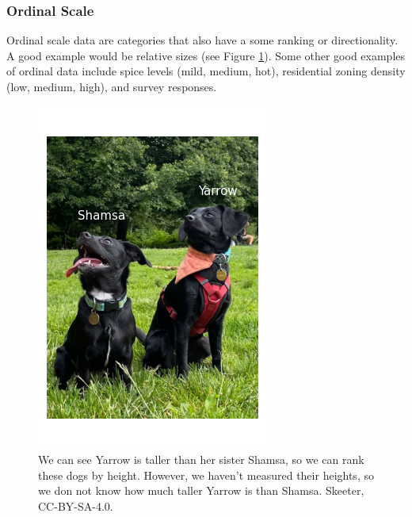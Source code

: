 \documentclass[
]{book}
\begin{document}
\hypertarget{ordinal-scale}{%
\subsubsection{Ordinal Scale}\label{ordinal-scale}}

Ordinal scale data are categories that also have a some ranking or directionality. A good example would be relative sizes (see Figure \ref{fig:3-dogs-ordinal}). Some other good examples of ordinal data include spice levels (mild, medium, hot), residential zoning density (low, medium, high), and survey responses.

\begin{figure}
\includegraphics[width=0.75\linewidth]{images/03-dogs-ordinal} \caption{We can see Yarrow is taller than her sister Shamsa, so we can rank these dogs by height. However, we haven't measured their heights, so we don not know how much taller Yarrow is than Shamsa. Skeeter, CC-BY-SA-4.0.}\label{fig:3-dogs-ordinal}
\end{figure}
\end{document}
